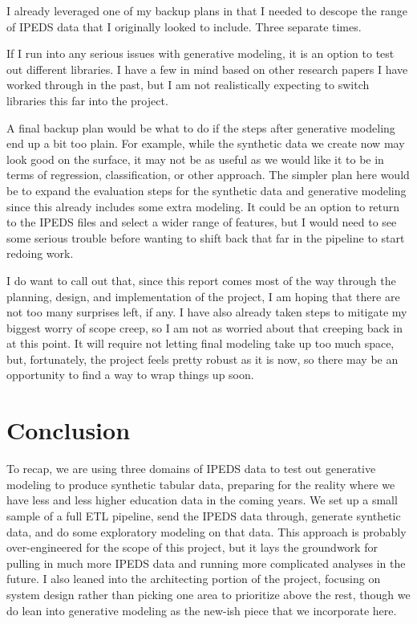 \documentclass[sigconf, authorversion, nonacm]{acmart}
\begin{document}
    I already leveraged one of my backup plans in that I needed to descope the range of IPEDS data that I originally looked to include. Three separate times.

    If I run into any serious issues with generative modeling, it is an option to test out different libraries. I have a few in mind based on other research papers I have worked through in the past, but I am not realistically expecting to switch libraries this far into the project.

    A final backup plan would be what to do if the steps after generative modeling end up a bit too plain. For example, while the synthetic data we create now may look good on the surface, it may not be as useful as we would like it to be in terms of regression, classification, or other approach. The simpler plan here would be to expand the evaluation steps for the synthetic data and generative modeling since this already includes some extra modeling. It could be an option to return to the IPEDS files and select a wider range of features, but I would need to see some serious trouble before wanting to shift back that far in the pipeline to start redoing work.

    I do want to call out that, since this report comes most of the way through the planning, design, and implementation of the project, I am hoping that there are not too many surprises left, if any. I have also already taken steps to mitigate my biggest worry of scope creep, so I am not as worried about that creeping back in at this point. It will require not letting final modeling take up too much space, but, fortunately, the project feels pretty robust as it is now, so there may be an opportunity to find a way to wrap things up soon.

\section{Conclusion}
    To recap, we are using three domains of IPEDS data to test out generative modeling to produce synthetic tabular data, preparing for the reality where we have less and less higher education data in the coming years. We set up a small sample of a full ETL pipeline, send the IPEDS data through, generate synthetic data, and do some exploratory modeling on that data. This approach is probably over-engineered for the scope of this project, but it lays the groundwork for pulling in much more IPEDS data and running more complicated analyses in the future. I also leaned into the architecting portion of the project, focusing on system design rather than picking one area to prioritize above the rest, though we do lean into generative modeling as the new-ish piece that we incorporate here.
\end{document}
